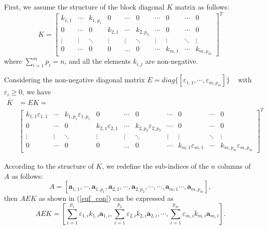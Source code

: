\documentclass{article}
\begin{document}
First, we assume the structure of the block diagonal $K$ matrix as follows:
\begin{equation}\label{integral_matrix}
K=
\begin{bmatrix}
    k_{1,1} & \cdots & k_{1, p_1} & 0 & \cdots & 0 & \cdots & 0 & \cdots & 0 \\
    0 & \cdots & 0 & k_{2, 1} & \cdots & k_{2, p_2} & \cdots & 0 & \cdots & 0\\
    \vdots & \vdots & \ddots & \vdots & \vdots & \ddots & \vdots & \vdots & \ddots & \vdots \\
    0 & \cdots & 0 & 0 & \dots & 0 & \cdots & k_{m, 1} & \cdots & k_{m, p_m}
\end{bmatrix}^T
\end{equation}
where $\sum_{i=1}^{m} p_i = n$, and all the elements $k_{i,j}$ are non-negative.

Considering the non-negative diagonal matrix $ E= diag\{ [\varepsilon _{1,1}, \cdots,
  \varepsilon_{m,p_m}] \} \,\,\, \,\, $ with $\varepsilon _{i} \ge 0 $, we have 
\begin{equation}\label{integral_matrix_E}
\begin{aligned}
\bar K& = E K=\\
&\begin{bmatrix}
    k_{1,1} \varepsilon _{1,1} & \cdots & k_{1, p_1} \varepsilon _{1, p_1} & 0 & \cdots & 0 & \cdots & 0 & \cdots & 0 \\
    0 & \cdots & 0 & k_{2, 1} \varepsilon _{2, 1} & \cdots & k_{2, p_2} \varepsilon _{2, p_2} & \cdots & 0 & \cdots & 0\\
    \vdots & \vdots & \ddots & \vdots & \vdots & \ddots & \vdots & \vdots & \ddots & \vdots \\
    0 & \cdots & 0 & 0 & \dots & 0 & \cdots & k_{m, 1} \varepsilon _{m,1} & \cdots & k_{m, p_m} \varepsilon _{m, p_m}
\end{bmatrix}^T
\end{aligned}
\end{equation}  

According to the structure of $K$, we redefine the sub-indices of the $n$ columns of $A$ as follows: 
$$A=[\boldsymbol{a}_{1,1}, \cdots, \boldsymbol{a}_{1,p_1}, \boldsymbol{a}_{2,1}, \cdots, \boldsymbol{a}_{2,p_2}, \cdots, \cdots, \boldsymbol{a}_{m,1} \cdots,\boldsymbol{a}_{m,p_m}],$$ 
then $AEK$ as shown in (\ref{suf_con}) can be expressed as 
\begin{equation}\label{eq_li_comb}
AEK = [ \sum_{i=1}^{p_1} \varepsilon_{1,i} k_{1,i} \boldsymbol{a}_{1,i}, \sum_{i=1}^{p_2} \varepsilon_{2, i} k_{2,i} \boldsymbol{a}_{2,i}, \cdots, \sum_{i=1}^{p_m} \varepsilon_{m,i} k_{m,i} \boldsymbol{a}_{m,i}].
\end{equation}
\end{document}
